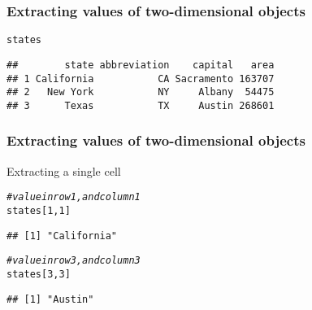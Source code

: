\documentclass[12pt]{beamer}\usepackage[]{graphicx}\usepackage[]{color}
\makeatletter
\newcommand{\hlnum}[1]{\textcolor[rgb]{0.686,0.059,0.569}{#1}}%
\newcommand{\hlcom}[1]{\textcolor[rgb]{0.678,0.584,0.686}{\textit{#1}}}%
\newcommand{\hlstd}[1]{\textcolor[rgb]{0.345,0.345,0.345}{#1}}%
\newenvironment{kframe}{%
 \def\at@end@of@kframe{}%
 \ifinner\ifhmode%
  \def\at@end@of@kframe{\end{minipage}}%
  \begin{minipage}{\columnwidth}%
 \fi\fi%
 \def\FrameCommand##1{\hskip\@totalleftmargin \hskip-\fboxsep
 \colorbox{shadecolor}{##1}\hskip-\fboxsep
     \hskip-\linewidth \hskip-\@totalleftmargin \hskip\columnwidth}%
 \MakeFramed {\advance\hsize-\width
   \@totalleftmargin\z@ \linewidth\hsize
   \@setminipage}}%
 {\par\unskip\endMakeFramed%
 \at@end@of@kframe}
\newenvironment{knitrout}{}{} %
\makeatother
\begin{document}

\begin{frame}[fragile]
\frametitle{Extracting values of two-dimensional objects}

\begin{knitrout}\footnotesize
{}\color{fgcolor}\begin{kframe}
\begin{alltt}
\hlstd{states}
\end{alltt}
\begin{verbatim}
##        state abbreviation    capital   area
## 1 California           CA Sacramento 163707
## 2   New York           NY     Albany  54475
## 3      Texas           TX     Austin 268601
\end{verbatim}
\end{kframe}
\end{knitrout}

\end{frame}


\begin{frame}[fragile]
\frametitle{Extracting values of two-dimensional objects}

Extracting a single cell
\begin{knitrout}\footnotesize
{}\color{fgcolor}\begin{kframe}
\begin{alltt}
\hlcom{# value in row 1, and column 1}
\hlstd{states[}\hlnum{1}\hlstd{,}\hlnum{1}\hlstd{]}
\end{alltt}
\begin{verbatim}
## [1] "California"
\end{verbatim}
\begin{alltt}
\hlcom{# value in row 3, and column 3}
\hlstd{states[}\hlnum{3}\hlstd{,}\hlnum{3}\hlstd{]}
\end{alltt}
\begin{verbatim}
## [1] "Austin"
\end{verbatim}
\end{kframe}
\end{knitrout}

\end{frame}

\end{document}
